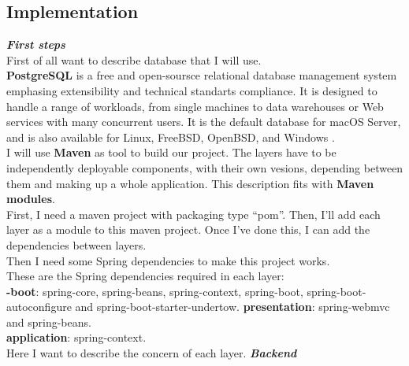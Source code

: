 \documentclass{scrartcl}
\begin{document}
\subsection{Implementation}
\textbf{\textit{First steps}}\\
First of all want to describe database that I will use.\\
\textbf{PostgreSQL} is a free and open-soursce relational database management system emphasing extensibility and technical standarts compliance. It is designed to handle a range of workloads, from single machines to data warehouses or Web services with many concurrent users. It is the default database for macOS Server, and is also available for Linux, FreeBSD, OpenBSD, and Windows \cite{wiki-posgres}.\\

 I  will use \textbf{Maven} as tool to build our project. The layers have to be independently deployable components, with  their own vesions, depending between them and making up a whole application. This description fits with \textbf{Maven modules}.\\
 First, I need a maven project with packaging type “pom”. Then, I'll add each layer as a module to this maven project. Once I’ve  done this, I can add the dependencies between layers.\\
 Then I need some Spring dependencies to make this project works.\\
 These are the Spring dependencies required in each layer:\\
\textbf{-boot}: spring-core, spring-beans, spring-context, spring-boot, spring-boot-autoconfigure     	and spring-boot-starter-undertow.
\textbf{presentation}: spring-webmvc and spring-beans.\\
\textbf{application}: spring-context.\\

Here I want to describe the concern of each layer.
\textbf{\textit{Backend }}
\end{document}
